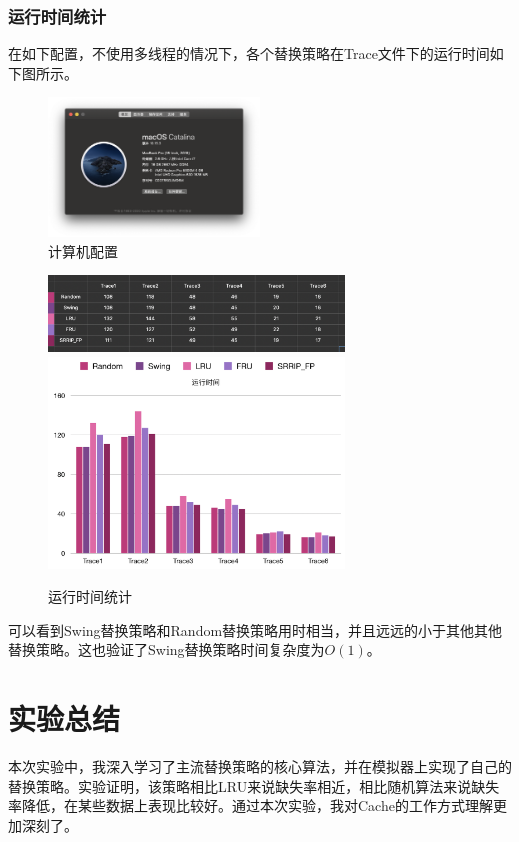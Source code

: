 \documentclass{article}
\begin{document}
\subsubsection{运行时间统计}
在如下配置，不使用多线程的情况下，各个替换策略在Trace文件下的运行时间如下图所示。
\begin{figure}[H]
    \centering
    \includegraphics[width=0.5\textwidth]{pic8.png}
    \caption{计算机配置}
\end{figure}

\begin{figure}[H]
    \centering
    \includegraphics[width=0.7\textwidth]{pic10.png}
    \includegraphics[width=0.7\textwidth]{pic9.png}
    \caption{运行时间统计}
\end{figure}
可以看到Swing替换策略和Random替换策略用时相当，并且远远的小于其他其他替换策略。这也验证了Swing替换策略时间复杂度为$O(1)$。

\section{实验总结}
本次实验中，我深入学习了主流替换策略的核心算法，并在模拟器上实现了自己的替换策略。实验证明，该策略相比LRU来说缺失率相近，相比随机算法来说缺失率降低，在某些数据上表现比较好。通过本次实验，我对Cache的工作方式理解更加深刻了。
\end{document}
